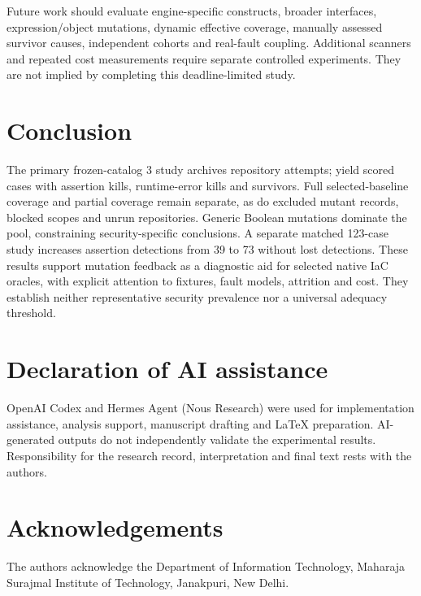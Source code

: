 Future work should evaluate engine-specific constructs, broader interfaces, expression/object mutations, dynamic effective coverage, manually assessed survivor causes, independent cohorts and real-fault coupling. Additional scanners and repeated cost measurements require separate controlled experiments. They are not implied by completing this deadline-limited study.

\section{Conclusion}\label{sec:conclusion}
The primary frozen-catalog 3 study archives \ArchivedRepos{} repository attempts; \ScoredRepos{} yield \NScored{} scored cases with \AssertionKills{} assertion kills, \RuntimeKills{} runtime-error kills and \Survivors{} survivors. Full selected-baseline coverage and partial coverage remain separate, as do \ExcludedCases{} excluded mutant records, blocked scopes and unrun repositories. Generic Boolean mutations dominate the pool, constraining security-specific conclusions. A separate matched 123-case study increases assertion detections from 39 to 73 without lost detections. These results support mutation feedback as a diagnostic aid for selected native IaC oracles, with explicit attention to fixtures, fault models, attrition and cost. They establish neither representative security prevalence nor a universal adequacy threshold.

\section*{Declaration of AI assistance}
OpenAI Codex and Hermes Agent (Nous Research) were used for implementation assistance, analysis support, manuscript drafting and LaTeX preparation. AI-generated outputs do not independently validate the experimental results. Responsibility for the research record, interpretation and final text rests with the authors.

\section*{Acknowledgements}
The authors acknowledge the Department of Information Technology, Maharaja Surajmal Institute of Technology, Janakpuri, New Delhi.

\label{lastmanuscriptpage}
\ifdefined\IncludeResponses
\clearpage

\fi

